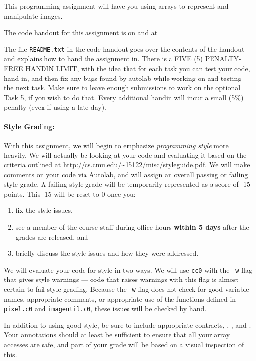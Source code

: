 \documentclass[12pt]{exam}
\begin{document}
\hwTitle

\noindent
This programming assignment will have you using arrays to represent
and manipulate images.

\bigskip
\noindent
The code handout for this assignment is on \autolab{} and at
\begin{center}
\end{center}
The file \lstinline'README.txt' in the code handout goes over the contents
of the handout and explains how to hand the assignment in.  There is
a FIVE (5) PENALTY-FREE HANDIN LIMIT, with the idea that for each task
you can test your code, hand in, and then fix any bugs found by autolab
while working on and testing the next task. Make sure to leave enough
submissions to work on the optional Task 5, if you wish to do that.
Every additional handin will incur a small (5\%) penalty (even if
using a late day).

\paragraph{Style Grading:}
With this assignment, we will begin to emphasize \emph{programming
  style} more heavily. We will actually be looking at your code and
evaluating it based on the criteria outlined at
\url{http://cs.cmu.edu/~15122/misc/styleguide.pdf}. We will make
comments on your code via Autolab, and will assign an overall passing
or failing style grade. A failing style grade will be temporarily
represented as a score of -15 points.  This -15 will be reset to 0
once you:
\begin{enumerate}
\itemsep=-3pt
\item%
  fix the style issues,
\item%
  see a member of the course staff during office hours \textbf{within
    5 days} after the grades are released, and
\item%
  briefly discuss the style issues and how they were addressed.
\end{enumerate}
We will evaluate your code for style in two ways. We will use
\lstinline'cc0' with the \lstinline'-w' flag that gives style warnings
--- code that raises warnings with this flag is almost certain to fail
style grading. Because the \lstinline'-w' flag does not check for good
variable names, appropriate comments, or appropriate use of the
functions defined in \lstinline'pixel.c0' and
\lstinline'imageutil.c0', these issues will be checked by hand.

\begin{task}[3]
  In addition to using good style, be sure to include appropriate contracts,
  \requires{}, \ensures{}, and \loopinvariant{}. Your annotations should at
  least be sufficient to ensure that all your array accesses are safe, and
  part of your grade will be based on a visual inspection of this.
\end{task}
\end{document}
